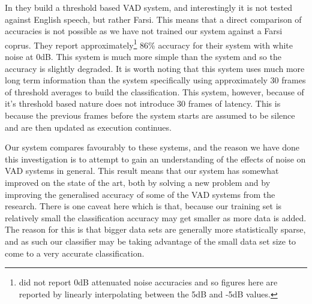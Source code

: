 \documentclass[ %
                    author={Sam Phippen},
                supervisor={Dr. Rafal Bogacz},
                     title={Real time voice activity detectors in noisy personal computing environments},
                  subtitle={},
                    degree={MEng},
                      year={2012} ]{thesis}
\begin{document}
In \cite{moattar} they build a threshold based VAD system, and interestingly it
is not tested against English speech, but rather Farsi. This means that a
direct comparison of accuracies is not possible as we have not trained our
system against a Farsi coprus. They report
approximately\footnote{\cite{moattar} did not report 0dB attenuated noise
accuracies and so figures here are reported by linearly interpolating between
the 5dB and -5dB values.} 86\% accuracy for their system with white noise at
0dB. This system is much more simple than the \cite{shin} system and so the
accuracy is slightly degraded. It is worth noting that this system uses much
more long term information than the \cite{shin} system specifically using
approximately 30 frames of threshold averages to build the classification. This
system, however, because of it's threshold based nature does not introduce 30
frames of latency. This is because the previous frames before the system starts
are assumed to be silence and are then updated as execution continues.

Our system compares favourably to these systems, and the reason we have done
this investigation is to attempt to gain an understanding of the effects of
noise on VAD systems in general. This result means that our system has somewhat
improved on the state of the art, both by solving a new problem and by
improving the generalised accuracy of some of the VAD systems from the
research. There is one caveat here which is that, because our training set is
relatively small the classification accuracy may get smaller as more data is
added. The reason for this is that bigger data sets are generally more
statistically sparse, and as such our classifier may be taking advantage of the
small data set size to come to a very accurate classification.

%
%
\end{document}
